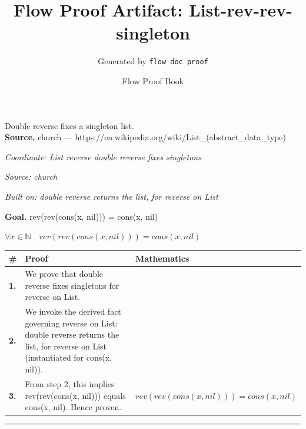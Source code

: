 \documentclass[11pt]{article}
\title{Flow Proof Artifact: List-rev-rev-singleton}
\author{Generated by \texttt{flow doc proof}}
\date{Flow Proof Book}
\theoremstyle{definition}
\begin{document}
\maketitle
Double reverse fixes a singleton list.\\[0.5em]
\textbf{Source.} church — https://en.wikipedia.org/wiki/List\_(abstract\_data\_type)\\[0.5em]
\bigskip
{}\par
\smallskip\noindent\textit{Coordinate: List \cdot reverse \cdot double reverse fixes singletons}\par
\smallskip\noindent\textit{Source: church}\par
\smallskip\noindent\textit{Built on: double reverse returns the list, for reverse on List}\par
\medskip
\noindent\textbf{Goal.} rev(rev(cons(x, nil))) = cons(x, nil)\par
\noindent$\displaystyle \forall x \in \mathbb{N}\quad rev(rev(cons(x, nil))) = cons(x, nil)$\par
\medskip
\noindent
\begin{tabular}{@{} >{\raggedright\arraybackslash}p{} >{\raggedright\arraybackslash}p{} >{\raggedleft\arraybackslash}p{} @{}}
\textbf{\#} & \textbf{Proof} & \textbf{Mathematics} \\
\midrule
\textbf{1.} & We prove that double reverse fixes singletons for reverse on List. & \\[0.45em]
\textbf{2.} & We invoke the derived fact governing reverse on List: double reverse returns the list, for reverse on List (instantiated for cons(x, nil)). & \\[0.45em]
\textbf{3.} & From step 2, this implies rev(rev(cons(x, nil))) equals cons(x, nil). Hence proven. & $\displaystyle rev(rev(cons(x, nil))) = cons(x, nil)$ \\[0.45em]
\bottomrule
\end{tabular}
\label{thm:List-reverse-double_reverse_fixes_singletons}
\par\medskip\hrule
\end{document}
